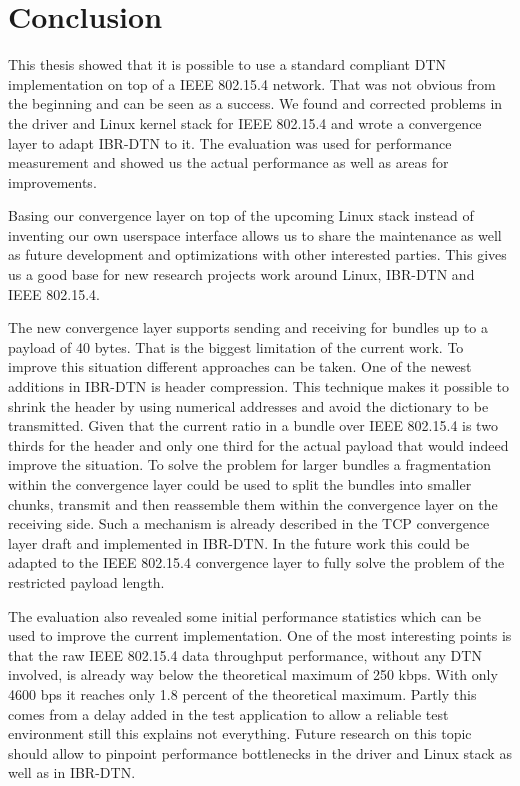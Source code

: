 \chapter{Conclusion}

This thesis showed that it is possible to use a standard compliant DTN
implementation on top of a IEEE 802.15.4 network. That was not obvious from the
beginning and can be seen as a success. We found and corrected problems in the
driver and Linux kernel stack for IEEE 802.15.4 and wrote a convergence layer to
adapt IBR-DTN to it. The evaluation was used for performance measurement and
showed us the actual performance as well as areas for improvements.

Basing our convergence layer on top of the upcoming Linux stack instead of
inventing our own userspace interface allows us to share the maintenance as well
as future development and optimizations with other interested parties. This
gives us a good base for new research projects work around Linux, IBR-DTN and
IEEE 802.15.4.

The new convergence layer supports sending and receiving for bundles up to a
payload of 40 bytes. That is the biggest limitation of the current work. To
improve this situation different approaches can be taken. One of the newest
additions in IBR-DTN is header compression. This technique makes it possible to
shrink the header by using numerical addresses and avoid the dictionary to be
transmitted. Given that the current ratio in a bundle over IEEE 802.15.4 is two
thirds for the header and only one third for the actual payload that would indeed
improve the situation. To solve the problem for larger bundles a fragmentation
within the convergence layer could be used to split the bundles into smaller
chunks, transmit and then reassemble them within the convergence layer on the
receiving side. Such a mechanism is already described in the TCP convergence
layer draft \cite{tcp-clayer-draft} and implemented in IBR-DTN. In the future
work this could be adapted to the IEEE 802.15.4 convergence layer to fully
solve the problem of the restricted payload length.

The evaluation also revealed some initial performance statistics which can be
used to improve the current implementation. One of the most interesting points
is that the raw IEEE 802.15.4 data throughput performance, without any DTN
involved, is already way below the theoretical maximum of 250 kbps. With only
4600 bps it reaches only 1.8 percent of the theoretical maximum. Partly this
comes from a delay added in the test application to allow a reliable test
environment still this explains not everything. Future research on this topic
should allow to pinpoint performance bottlenecks in the driver and Linux stack
as well as in IBR-DTN.
